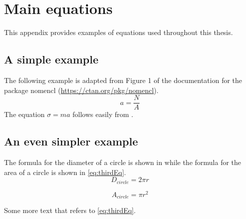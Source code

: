 \documentclass[
English,                 %
includepublications,    %
%
%
%
%
%
%
%
%
%
%
%
%
%
%
%
%
%
%
]{kththesis}
\begin{document}
    \chapter{Main equations}
    \label{ch:NomenclatureExamples}
    This appendix provides examples of equations used throughout this thesis.
    \section{A simple example}
    The following example is adapted from Figure 1 of the documentation for the package nomencl (\url{https://ctan.org/pkg/nomencl}).
    \begin{equation}\label{eq:mainEq}
    a=\frac{N}{A}
    \end{equation}
    The equation $\sigma = m a$%
     follows easily from .

    \section{An even simpler example}
    The formula for the diameter of a circle is shown in  while the formula for the area of a circle is shown in \cref{eq:thirdEq}.
    \begin{equation}\label{eq:secondEq}
    D_{circle}=2\pi r
    \end{equation}

    \begin{equation}\label{eq:thirdEq}
    A_{circle}=\pi r^2
    \end{equation}

    Some more text that refers to \eqref{eq:thirdEq}.
\cleardoublepage
\fi  %
\end{document}
